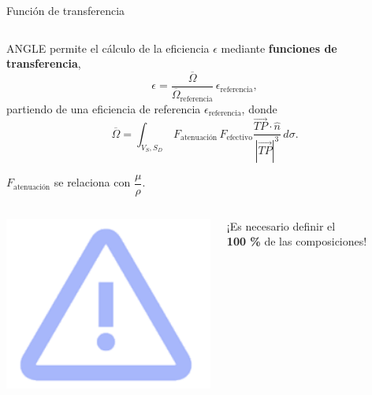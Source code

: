 \documentclass[9pt]{beamer}
\begin{document}
\begin{frame}{Función de transferencia}
	\begin{columns}
		\begin{column}{0.58\textwidth}
			\justifying
			ANGLE permite el cálculo de la eficiencia $\epsilon$ mediante \textbf{funciones de transferencia}, 
			\begin{equation}
				\epsilon = \dfrac{\overline{\Omega}}{\overline{\Omega}_\text{referencia}}\,\epsilon_\text{referencia},
			\end{equation}
partiendo de una eficiencia de referencia $\epsilon_\text{referencia}$, donde 
			\begin{equation}
				\overline{\Omega} = \int_{V_S, S_D}\,\displaystyle F_{\text{atenuación}}\,F_{\text{efectivo}} \dfrac{\overrightarrow{TP}\cdot\hat{n}}{|\overrightarrow{TP}|^3}\,d\sigma.
			\end{equation}
			\begin{center}
			$F_{\text{atenuación}}$ se relaciona con $\dfrac{\mu}{\rho}$.
			\end{center}
								\begin{columns}
			\begin{column}{0.2\textwidth}
			\includegraphics[width=1\textwidth]{Imagenes/Atencion.png}
			\end{column}
			\begin{column}{0.8\textwidth} 
			 ¡Es necesario definir el \\ \textbf{100 \%} de las composiciones!
			\end{column}

\end{columns}
\end{column}
\end{columns}
\end{frame}
\end{document}
